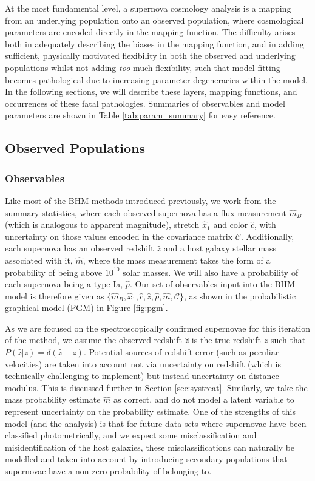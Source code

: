 \documentclass[a4paper,fleqn,usenatbib]{mnras}
\newcommand{\green}{\color{forestgreen}}
\newcommand{\cov}{\mathcal{C}}
\newcommand{\rubin}{\citetalias{Rubin2015}}
\begin{document}
At the most fundamental level, a supernova cosmology analysis is a mapping from an underlying population onto an observed population, where {\green cosmological parameters are} encoded directly in the mapping function. The difficulty arises both in adequately describing the biases in the mapping function, and in adding sufficient, physically motivated flexibility in both {\green the observed and underlying} populations whilst not adding \textit{too} much flexibility, such that model fitting becomes pathological due to increasing parameter degeneracies within the model. In the following sections, we will describe these layers, mapping functions, and occurrences of these fatal pathologies. Summaries of observables and model parameters are shown in Table \ref{tab:param_summary} for easy reference.


\subsection{Observed Populations}

\subsubsection{Observables}
Like most of the BHM methods introduced previously, we work from the summary statistics, where each observed supernova has a flux measurement $\hat{m}_B$ (which is analogous to apparent magnitude), stretch $\hat{x}_1$ and color $\hat{c}$, with uncertainty on those values encoded in the covariance matrix $\cov$. Additionally, each supernova has an observed redshift $\hat{z}$ and a host galaxy {\green stellar }mass associated with it, $\hat{m}$, where the mass measurement takes the form of a probability of being above $10^{10}$ solar masses. We will also have a probability of each supernova being a type Ia, $\hat{p}$. Our set of observables {\green input into the BHM model} is therefore given as $\lbrace \hat{m}_B, \hat{x}_1, \hat{c}, \hat{z}, \hat{p}, \hat{m}, \cov \rbrace$, as shown in the probabilistic graphical model (PGM) in Figure \ref{fig:pgm}.


As we are focused on the spectroscopically confirmed supernovae for this iteration of the method, we assume the observed redshift $\hat{z}$ is the true redshift $z$ such that $P(\hat{z}|z) = \delta(\hat{z} - z)$. Potential sources of redshift error (such as peculiar velocities) are taken into account not via uncertainty on redshift (which is technically challenging to implement) but instead uncertainty on distance modulus. This is discussed further in Section \ref{sec:systreat}. Similarly, we take the mass probability estimate $\hat{m}$ as correct, and do not model a latent variable to represent uncertainty on the probability estimate. One of the strengths of this model (and the {\rubin} analysis) is that for future data sets where supernovae have been classified photometrically, and we expect some misclassification and misidentification of the host galaxies, {\green these misclassifications} can naturally be modelled and taken into account by introducing secondary populations that supernovae have a non-zero probability of belonging to.
\end{document}
